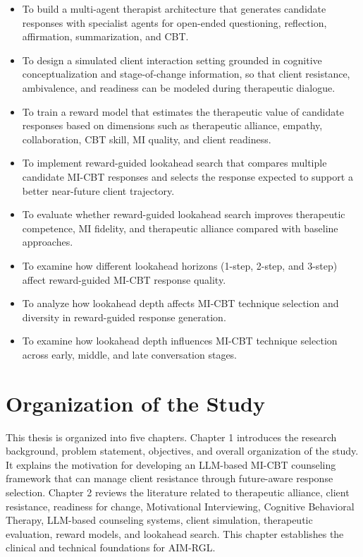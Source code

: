 \begin{itemize}[leftmargin=0.5in]
    \item To build a multi-agent therapist architecture that generates candidate responses with specialist agents for open-ended questioning, reflection, affirmation, summarization, and CBT.

    \item To design a simulated client interaction setting grounded in cognitive conceptualization and stage-of-change information, so that client resistance, ambivalence, and readiness can be modeled during therapeutic dialogue.

    \item To train a reward model that estimates the therapeutic value of candidate responses based on dimensions such as therapeutic alliance, empathy, collaboration, CBT skill, MI quality, and client readiness.

    \item To implement reward-guided lookahead search that compares multiple candidate MI-CBT responses and selects the response expected to support a better near-future client trajectory.

    \item To evaluate whether reward-guided lookahead search improves therapeutic competence, MI fidelity, and therapeutic alliance compared with baseline approaches.

    \item To examine how different lookahead horizons (1-step, 2-step, and 3-step) affect reward-guided MI-CBT response quality.

    \item To analyze how lookahead depth affects MI-CBT technique selection and diversity in reward-guided response generation.

    \item To examine how lookahead depth influences MI-CBT technique selection across early, middle, and late conversation stages.
\end{itemize}

\section{Organization of the Study}

This thesis is organized into five chapters. Chapter 1 introduces the research background, problem statement, objectives, and overall organization of the study. It explains the motivation for developing an LLM-based MI-CBT counseling framework that can manage client resistance through future-aware response selection. Chapter 2 reviews the literature related to therapeutic alliance, client resistance, readiness for change, Motivational Interviewing, Cognitive Behavioral Therapy, LLM-based counseling systems, client simulation, therapeutic evaluation, reward models, and lookahead search. This chapter establishes the clinical and technical foundations for AIM-RGL.

